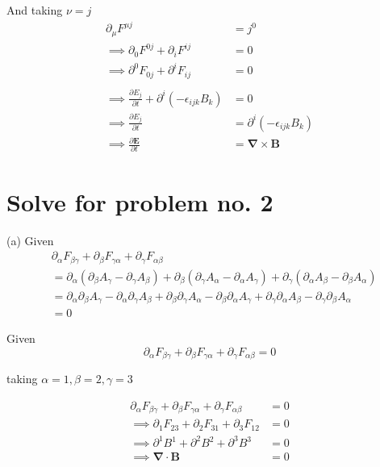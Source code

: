 \documentclass[12pt, letterpaper]{article}
\newcommand*{\1}{\hspace{1pt}}
\begin{document}
And taking $\nu = j$
\begin{align*}
    \partial _{\mu} F^{\mu j} &= j^{0} \\
    \implies \partial_{0} F^{0 j} + \partial_{i} F^{ij} &= 0 \\
    \implies \partial^{0} F_{0 j} + \partial^{i} F_{ij} &= 0 \\ \\
    \implies \frac{\partial E_{j}}{\partial t} + \partial ^{i} (-\epsilon_{ijk}B_{k}) &= 0 \\
    \implies \frac{\partial E_{j}}{\partial t} &= \partial ^{i} (-\epsilon_{ijk}B_{k}) \\
    \implies \frac{\partial \boldsymbol{E}}{\partial t} &= \boldsymbol{\nabla} \times \boldsymbol{B} 
\end{align*}

\section*{Solve for problem no. 2}

(a)
Given 
\begin{align*}
    &\partial_{\alpha} F_{\beta \gamma} + \partial_{\beta} F_{\gamma \alpha} + \partial_{\gamma} F_{\alpha \beta} \\
    &= \partial_{\alpha}(\partial_{\beta} A_{\gamma} - \partial_{\gamma} A_{\beta}) + \partial_{\beta}(\partial_{\gamma} A_{\alpha} - \partial_{\alpha} A_{\gamma}) + \partial_{\gamma}(\partial_{\alpha} A_{\beta} - \partial_{\beta} A_{\alpha}) \\ 
    &= \partial_{\alpha} \partial_{\beta}A_{\gamma} - \partial_{\alpha} \partial_{\gamma}A_{\beta} + \partial_{\beta} \partial_{\gamma}A_{\alpha} - \partial_{\beta} \partial_{\alpha}A_{\gamma} + \partial_{\gamma} \partial_{\alpha}A_{\beta} - \partial_{\gamma} \partial_{\beta}A_{\alpha} \\ 
    &= 0
\end{align*}

Given 
\begin{equation}
    \partial_{\alpha} F_{\beta \gamma} + \partial_{\beta} F_{\gamma \alpha} + \partial_{\gamma} F_{\alpha \beta} = 0
\end{equation}

taking $\alpha=1, \beta=2, \gamma=3$ 

\begin{align*}
    \partial_{\alpha} F_{\beta \gamma} + \partial_{\beta} F_{\gamma \alpha} + \partial_{\gamma} F_{\alpha \beta} &= 0\\
    \implies \partial_{1} F_{23} + \partial_{2} F_{31} + \partial_{3} F_{12} &= 0\\
    \implies \partial^{1} B^{1} + \partial^{2} B^{2} + \partial^{3} B^{3}  &= 0\\
    \implies \boldsymbol{\nabla} \cdot \boldsymbol{B} &= 0
\end{align*}
\end{document}

